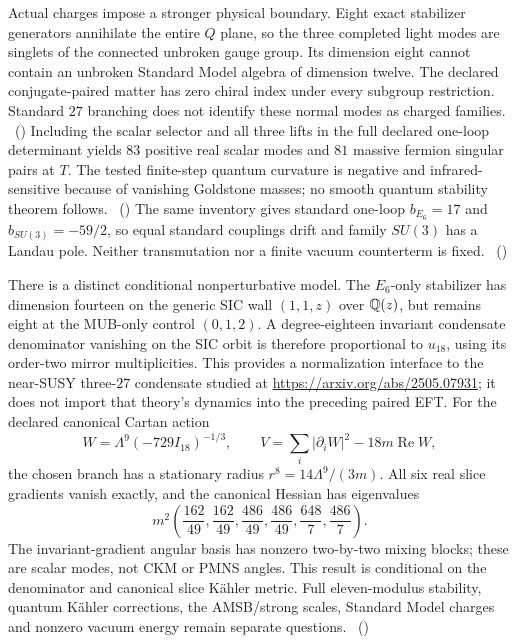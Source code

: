Actual charges impose a stronger physical boundary. Eight exact stabilizer
generators annihilate the entire $Q$ plane, so the three completed light
modes are singlets of the connected unbroken gauge group. Its dimension eight
cannot contain an unbroken Standard Model algebra of dimension twelve.
The declared conjugate-paired matter has zero chiral index under every
subgroup restriction. Standard $27$ branching does not identify these normal
modes as charged families.
\tierC\ ()
Including the scalar selector and all three lifts in the full declared
one-loop determinant yields $83$ positive real scalar modes and $81$ massive
fermion singular pairs at $T$. The tested finite-step quantum curvature is
negative and infrared-sensitive because of vanishing Goldstone masses; no
smooth quantum stability theorem follows.
\tierC\ ()
The same inventory gives standard one-loop $b_{E_6}=17$ and
$b_{SU(3)}=-59/2$, so equal standard couplings drift and family $SU(3)$ has a
Landau pole. Neither transmutation nor a finite vacuum counterterm is fixed.
\tierC\ ()

There is a distinct conditional nonperturbative model. The $E_6$-only
stabilizer has dimension fourteen on the generic SIC wall $(1,1,z)$ over
$\mathbb{Q}(z)$, but remains eight at the MUB-only control $(0,1,2)$.
A degree-eighteen invariant condensate denominator vanishing on the SIC
orbit is therefore proportional to $u_{18}$, using its order-two mirror
multiplicities. This provides a normalization interface to the near-SUSY
three-$27$ condensate studied at \url{https://arxiv.org/abs/2505.07931}; it
does not import that theory's dynamics into the preceding paired EFT.
For the declared canonical Cartan action
\[
 W=\Lambda^9(-729I_{18})^{-1/3},\qquad
 V=\sum_i|\partial_iW|^2-18m\operatorname{Re}W,
\]
the chosen branch has a stationary radius $r^8=14\Lambda^9/(3m)$.
All six real slice gradients vanish exactly, and the canonical Hessian
has eigenvalues
\[
 m^2\left(\frac{162}{49},\frac{162}{49},\frac{486}{49},
 \frac{486}{49},\frac{648}{7},\frac{486}{7}\right).
\]
The invariant-gradient angular basis has nonzero two-by-two mixing blocks;
these are scalar modes, not CKM or PMNS angles. This result is conditional
on the denominator and canonical slice K\"ahler metric. Full eleven-modulus
stability, quantum K\"ahler corrections, the AMSB/strong scales, Standard Model
charges and nonzero vacuum energy remain separate questions.
\tierC\ ()

